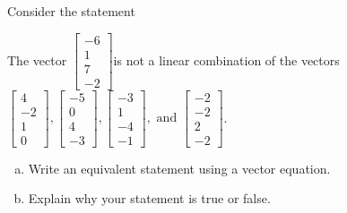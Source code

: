 
\begin{exerciseStatement}


Consider the statement 
\begin{center}\begin{minipage}{0.8\textwidth}
 The vector \( \left[\begin{array}{c}
-6 \\
1 \\
7 \\
-2
\end{array}\right] \)is not a linear combination of the vectors \( \left[\begin{array}{c}
4 \\
-2 \\
1 \\
0
\end{array}\right] , \left[\begin{array}{c}
-5 \\
0 \\
4 \\
-3
\end{array}\right] , \left[\begin{array}{c}
-3 \\
1 \\
-4 \\
-1
\end{array}\right] , \text{ and } \left[\begin{array}{c}
-2 \\
-2 \\
2 \\
-2
\end{array}\right] \). 
\end{minipage}\end{center}
    


\begin{enumerate}[(a)]
\item  Write an equivalent statement using a vector equation.
\item  Explain why your statement is true or false.
\end{enumerate}
    
\end{exerciseStatement}
    
